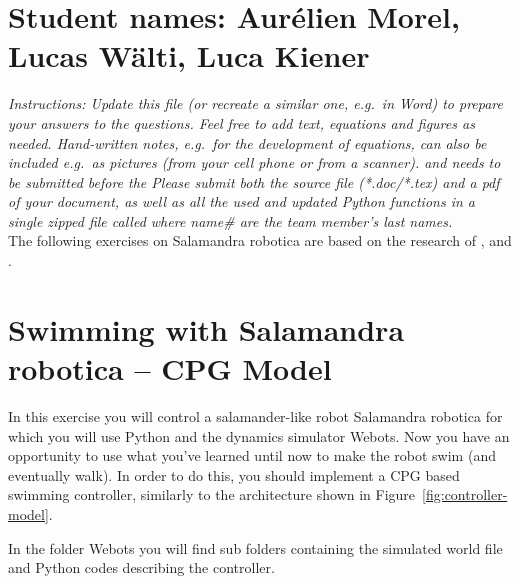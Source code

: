 \documentclass{cmc}
\begin{document}
\pagestyle{fancy}
 

\section*{Student names: Aurélien Morel, Lucas Wälti, Luca Kiener}

\textit{Instructions: Update this file (or recreate a similar one, e.g.\ in
  Word) to prepare your answers to the questions. Feel free to add text,
  equations and figures as needed. Hand-written notes, e.g.\ for the development
  of equations, can also be included e.g.\ as pictures (from your cell phone or
  from a scanner).  \textbf{} and needs to be
  submitted before the \textbf{} Please submit both the source
  file (*.doc/*.tex) and a pdf of your document, as well as all the used and
  updated Python functions in a single zipped file called
   where name\# are the team
  member’s last names.  }
\\

The following exercises on Salamandra robotica are based
on the research of \cite{Crespi2013}, \cite{Karakasiliotis2013} and
\cite{ijspeert2007swimming}.

\section*{Swimming with Salamandra robotica – CPG Model}
\label{sec:exploring-swimming}

In this exercise you will control a salamander-like robot Salamandra
robotica for which you will use Python and the dynamics simulator
Webots. Now you have an opportunity to use what you’ve learned until
now to make the robot swim (and eventually walk). In order to do this,
you should implement a CPG based swimming controller, similarly to the
architecture shown in Figure~\ref{fig:controller-model}.

In the folder Webots you will find sub folders containing the simulated
world file and Python codes describing the controller.
\end{document}

